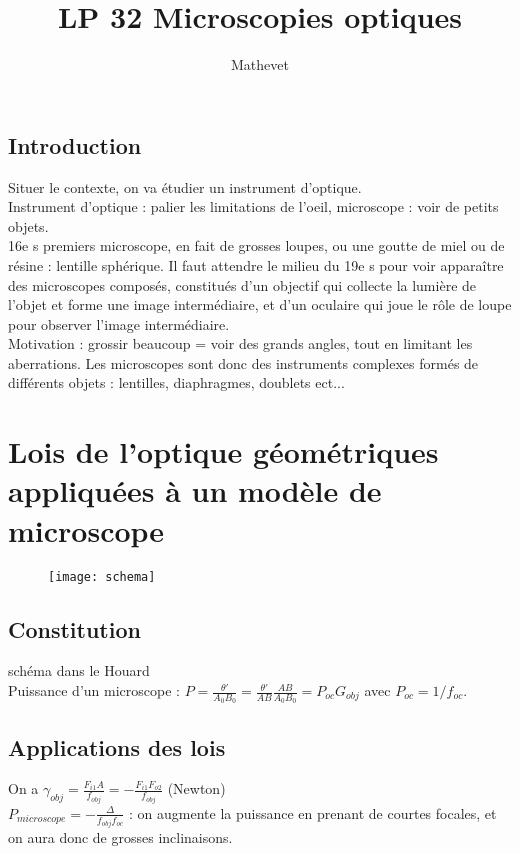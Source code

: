 \documentclass[12pt,prb,aps,epsf]{article}
\begin{document}
	
	\title{LP 32 Microscopies optiques}
	\author{Mathevet}
	
	\maketitle
	
	\tableofcontents
	
	\pagebreak
	

\subsection{Introduction}
Situer le contexte, on va étudier un instrument d'optique.\\
Instrument d'optique : palier les limitations de l'oeil, microscope : voir de petits objets.\\
16e s premiers microscope, en fait de grosses loupes, ou une goutte de miel ou de résine : lentille sphérique. Il faut attendre le milieu du 19e s pour voir apparaître des microscopes composés, constitués d'un objectif qui collecte la lumière de l'objet et forme une image intermédiaire, et d'un oculaire qui joue le rôle de loupe pour observer l'image intermédiaire.\\

Motivation : grossir beaucoup = voir des grands angles, tout en limitant les aberrations. Les microscopes sont donc des instruments complexes formés de différents objets : lentilles, diaphragmes, doublets ect...

\section{Lois de l'optique géométriques appliquées à un modèle de microscope}
\begin{figure}
	\centerline{\texttt{[image: schema]}}
\end{figure}
\subsection{Constitution}
schéma dans le Houard\\
Puissance d'un microscope : $P = \frac{\theta'}{A_0B_0} = \frac{\theta'}{AB}
\frac{AB}{A_0B_0} = P_{oc}G_{obj}$ avec $P_{oc}=1/f_{oc}$.

\subsection{Applications des lois}
On a $\gamma_{obj} = \frac{F_{i1}A}{f_{obj}} = -\frac{F_{i1}F_{o2}}{f_{obj}}$ (Newton)\\
$P_{microscope} = -\frac{\Delta}{f_{obj}f_{oc}}$ : on augmente la puissance en prenant de courtes focales, et on aura donc de grosses inclinaisons.\\
\end{document}
